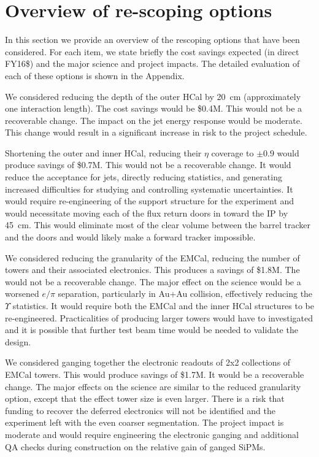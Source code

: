 
\section{Overview of re-scoping options}
\label{sec:overview-re-scoping}

In this section we provide an overview of the rescoping options that
have been considered.  For each item, we state briefly the cost
savings expected (in direct FY16\$) and the major science and project
impacts.  The detailed evaluation of each of these options is shown in
the Appendix.

We considered reducing the depth of the outer HCal by 20~cm
(approximately one interaction length).  The cost savings would be
\$0.4M.  This would not be a recoverable change. The impact on the jet
energy response would be moderate.  This change would result in a
significant increase in risk to the project schedule.

Shortening the outer and inner HCal, reducing their $\eta$ coverage to
$\pm0.9$ would produce savings of \$0.7M.  This would not be a
recoverable change.  It would reduce the acceptance for jets, directly
reducing statistics, and generating increased difficulties for
studying and controlling systematic uncertainties.  It would require
re-engineering of the support structure for the experiment and would
necessitate moving each of the flux return doors in toward the IP by
45~cm.  This would eliminate most of the clear volume between the
barrel tracker and the doors and would likely make a forward tracker
impossible.

We considered reducing the granularity of the EMCal, reducing the
number of towers and their associated electronics.  This produces a
savings of \$1.8M.  The would not be a recoverable change.  The major
effect on the science would be a worsened $e/\pi$ separation,
particularly in Au+Au collision, effectively reducing the $\Upsilon$
statistics.  It would require both the EMCal and the inner HCal
structures to be re-engineered.  Practicalities of producing larger towers
would have to investigated and it is possible that further test beam
time would be needed to validate the design.

We considered ganging together the electronic readouts of 2x2
collections of EMCal towers. This would produce savings of \$1.7M.  It
would be a recoverable change.  The major effects on the science are
similar to the reduced granularity option, except that the effect
tower size is even larger.  There is a risk that funding to recover
the deferred electronics will not be identified and the experiment
left with the even coarser segmentation.  The project impact is
moderate and would require engineering the electronic ganging and
additional QA checks during construction on the relative gain of
ganged SiPMs. 

